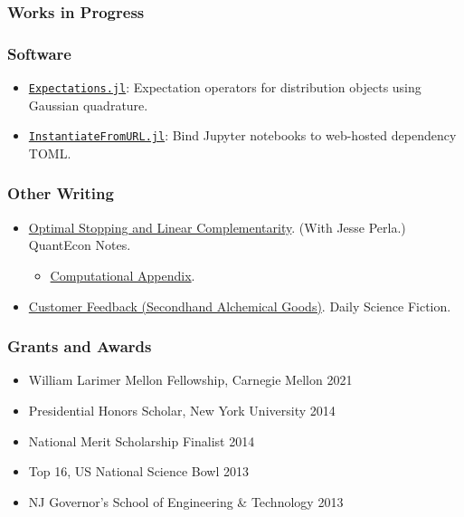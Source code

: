 \documentclass[12pt]{article}   %
\begin{document}
\subsubsection*{Works in Progress}
\begin{refsection} %
\nocite{FP}
\hspace*{1.2cm}%
\begin{minipage}{0.9\textwidth}%
  \printbibliography[heading=none, sorting=ynt]
\end{minipage}%
\end{refsection}


\subsubsection*{Software}
\begin{itemize}
  \item \href{https://github.com/QuantEcon/Expectations.jl}{\texttt{Expectations.jl}}: Expectation operators for distribution objects using Gaussian quadrature.
  \item \href{https://github.com/QuantEcon/InstantiateFromURL.jl}{\texttt{InstantiateFromURL.jl}}: Bind Jupyter notebooks to web-hosted dependency TOML.
\end{itemize}

\subsubsection*{Other Writing}
\begin{itemize}
  \item \href{https://notes.quantecon.org/submission/5c832d2be7b4c5000f4c8e48}{Optimal Stopping and Linear Complementarity}. (With Jesse Perla.) QuantEcon Notes.
  \begin{itemize}
    \item \href{https://quantecon.github.io/SimpleDifferentialOperators.jl/v0.4/generated/LCP_advanced.html}{Computational Appendix}.
  \end{itemize}
  \item \href{https://dailysciencefiction.com/fantasy/fantasy/arnav-sood/customer-feedback-secondhand-alchemical-goods}{Customer Feedback (Secondhand Alchemical Goods)}. Daily Science Fiction.
\end{itemize}

\subsubsection*{Grants and Awards}
\begin{itemize}
  \item William Larimer Mellon Fellowship, Carnegie Mellon \hfill 2021 
  \item Presidential Honors Scholar, New York University \hfill 2014
  \item National Merit Scholarship Finalist \hfill 2014
  \item Top 16, US National Science Bowl \hfill 2013
  \item NJ Governor's School of Engineering \& Technology \hfill 2013
\end{itemize}
\end{document}
